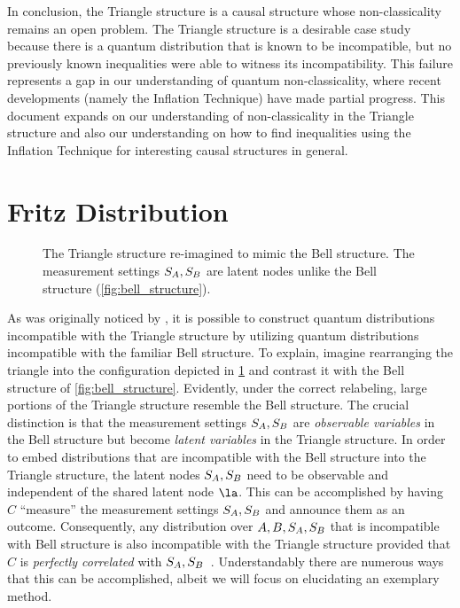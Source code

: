 \documentclass[aps, 10pt, english, twoside, pra, nofootinbib, tightenlines, longbibliography, superscriptaddress]{revtex4-1}
\begin{document}
    In conclusion, the Triangle structure is a causal structure whose non-classicality remains an open problem. The Triangle structure is a desirable case study because there is a quantum distribution that is known to be incompatible, but no previously known inequalities were able to witness its incompatibility. This failure represents a gap in our understanding of quantum non-classicality, where recent developments (namely the Inflation Technique) have made partial progress. This document expands on our understanding of non-classicality in the Triangle structure and also our understanding on how to find inequalities using the Inflation Technique for interesting causal structures in general.

    \section{Fritz Distribution}
    \label{sec:fritz_distribution}
    \begin{figure}
    \begin{center}
        \scalebox{1.0}{}
        \caption{The Triangle structure re-imagined to mimic the Bell structure. The measurement settings $S_{A},S_{B}$ are latent nodes unlike the Bell structure (\cref{fig:bell_structure}).}
        \label{fig:triangle_structure_with_fritz_bell_embedded}
    \end{center}
    \end{figure}

    As was originally noticed by \citet{Fritz_2012}, it is possible to construct quantum distributions incompatible with the Triangle structure by utilizing quantum distributions incompatible with the familiar Bell structure. To explain, imagine rearranging the triangle into the configuration depicted in \cref{fig:triangle_structure_with_fritz_bell_embedded} and contrast it with the Bell structure of \cref{fig:bell_structure}. Evidently, under the correct relabeling, large portions of the Triangle structure resemble the Bell structure. The crucial distinction is that the measurement settings $S_{A}, S_{B}$ are \textit{observable variables} in the Bell structure but become \textit{latent variables} in the Triangle structure. In order to embed distributions that are incompatible with the Bell structure into the Triangle structure, the latent nodes $S_{A}, S_{B}$ need to be observable and independent of the shared latent node $\la$. This can be accomplished by having $C$ ``measure'' the measurement settings $S_{A}, S_{B}$ and announce them as an outcome. Consequently, any distribution over $A, B, S_{A}, S_{B}$ that is incompatible with Bell structure is also incompatible with the Triangle structure provided that $C$ is \textit{perfectly correlated} with $S_{A}, S_{B}$~\cite{Fritz_2012}. Understandably there are numerous ways that this can be accomplished, albeit we will focus on elucidating an exemplary method.
\end{document}
